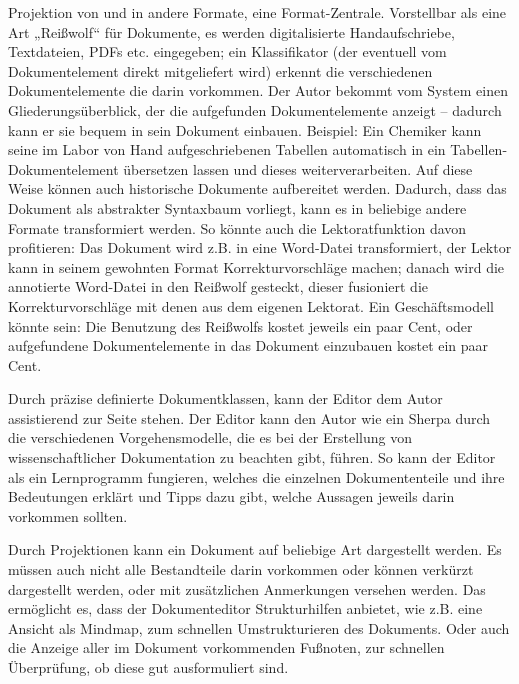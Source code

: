  
Projektion von und in andere Formate, eine Format-Zentrale. Vorstellbar als eine Art „Reißwolf“ für Dokumente, es werden digitalisierte Handaufschriebe, Textdateien, PDFs etc. eingegeben; ein Klassifikator (der eventuell vom Dokumentelement direkt mitgeliefert wird) erkennt die verschiedenen Dokumentelemente die darin vorkommen. Der Autor bekommt vom System einen Gliederungsüberblick, der die aufgefunden Dokumentelemente anzeigt -- dadurch kann er sie bequem in sein Dokument einbauen. Beispiel: Ein Chemiker kann seine im Labor von Hand aufgeschriebenen Tabellen automatisch in ein Tabellen-Dokumentelement übersetzen lassen und dieses weiterverarbeiten. Auf diese Weise können auch historische Dokumente aufbereitet werden. Dadurch, dass das Dokument als abstrakter Syntaxbaum vorliegt, kann es in beliebige andere Formate transformiert werden. So könnte auch die Lektoratfunktion davon profitieren: Das Dokument wird z.B. in eine Word-Datei transformiert, der Lektor kann in seinem gewohnten Format Korrekturvorschläge machen; danach wird die annotierte Word-Datei in den Reißwolf gesteckt, dieser fusioniert die Korrekturvorschläge mit denen aus dem eigenen Lektorat. Ein Geschäftsmodell könnte sein: Die Benutzung des Reißwolfs kostet jeweils ein paar Cent, oder aufgefundene Dokumentelemente in das Dokument einzubauen kostet ein paar Cent.

 
Durch präzise definierte Dokumentklassen, kann der Editor dem Autor assistierend zur Seite stehen. Der Editor kann den Autor wie ein Sherpa durch die verschiedenen Vorgehensmodelle, die es bei der Erstellung von wissenschaftlicher Dokumentation zu beachten gibt, führen. So kann der Editor als ein Lernprogramm fungieren, welches die einzelnen Dokumententeile und ihre Bedeutungen erklärt und Tipps dazu gibt, welche Aussagen jeweils darin vorkommen sollten.

 
Durch Projektionen kann ein Dokument auf beliebige Art dargestellt werden. Es müssen auch nicht alle Bestandteile darin vorkommen oder können verkürzt dargestellt werden, oder mit zusätzlichen Anmerkungen versehen werden. Das ermöglicht es, dass der Dokumenteditor Strukturhilfen anbietet, wie z.B. eine Ansicht als Mindmap, zum schnellen Umstrukturieren des Dokuments. Oder auch die Anzeige aller im Dokument vorkommenden Fußnoten, zur schnellen Überprüfung, ob diese gut ausformuliert sind.

